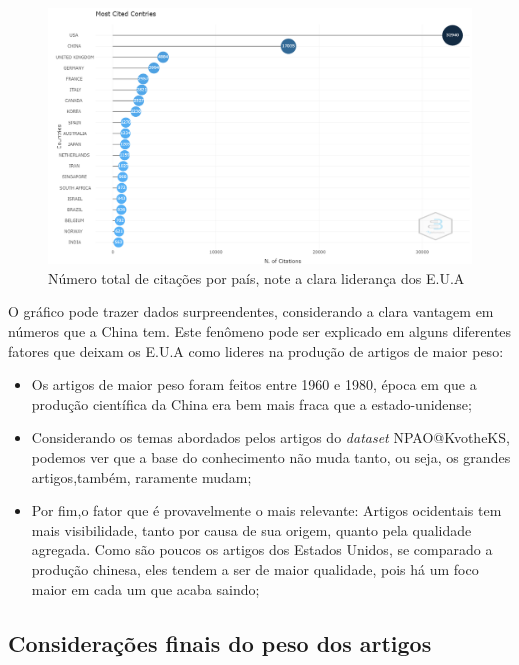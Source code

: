     \begin{figure}[H]
        \centering
        \includegraphics[width=1\textwidth]{experiments/KvotheKS/PesqBibliogr/AlgoritmosSimulacaoOptica-Dinamica/WoS-20220202/Bibliometric/Authors/Most_cited_countries.png}
        \caption{Número total de citações por país, note a clara liderança dos E.U.A}
        \label{fig:KvotheKS:Most_cited_countries}
    \end{figure}
    
    O gráfico pode trazer dados surpreendentes, considerando a clara vantagem em números que a China tem. Este fenômeno pode ser explicado em alguns diferentes fatores que deixam os E.U.A como lideres na produção de artigos de maior peso:
    
    \begin{itemize}
        \item Os artigos de maior peso foram feitos entre 1960 e 1980, época em que a produção científica da China era bem mais fraca que a estado-unidense;
        \item Considerando os temas abordados pelos artigos do \emph{dataset} NPAO@KvotheKS, podemos ver que a base do conhecimento não muda tanto, ou seja, os grandes artigos,também, raramente mudam;
        \item Por fim,o fator que é provavelmente o mais relevante: Artigos ocidentais tem mais visibilidade, tanto por causa de sua origem, quanto pela qualidade agregada. Como são poucos os artigos dos Estados Unidos, se comparado a produção chinesa, eles tendem a ser de maior qualidade, pois há um foco maior em cada um que acaba saindo;
    \end{itemize}
    
\subsection{Considerações finais do peso dos artigos}

